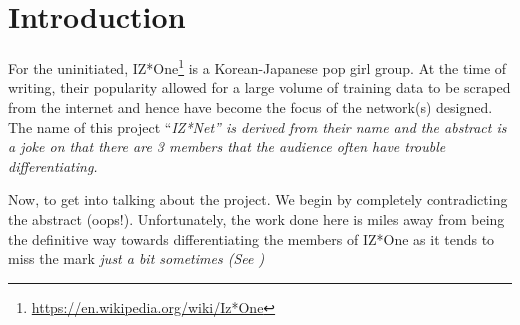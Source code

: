 \section{Introduction}\label{Section:Introductin}
For the uninitiated, IZ*One\footnote{\url{https://en.wikipedia.org/wiki/Iz*One}} is a Korean-Japanese pop girl group.
At the time of writing, their popularity allowed for a large volume of training data to be scraped from the internet and hence have become the focus of the network(s) designed.
The name of this project ``\it{IZ*Net}'' is derived from their name and the abstract is a joke on that there are 3 members that the audience often have trouble differentiating.

Now, to get into talking about the project.
We begin by completely contradicting the abstract (oops!).
Unfortunately, the work done here is miles away from being the definitive way towards differentiating the members of IZ*One as it tends to miss the mark \it{just a bit} sometimes (See )

